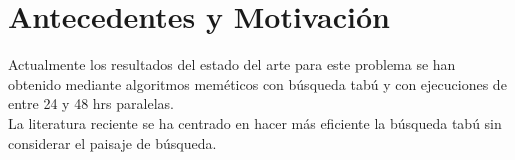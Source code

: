 \section{Antecedentes y Motivación}
Actualmente los resultados del estado del arte para este problema se han obtenido mediante algoritmos meméticos con búsqueda tabú y con ejecuciones de entre 24 y 48 hrs paralelas.\\
La literatura reciente se ha centrado en hacer más eficiente la búsqueda tabú sin considerar el paisaje de búsqueda.\\